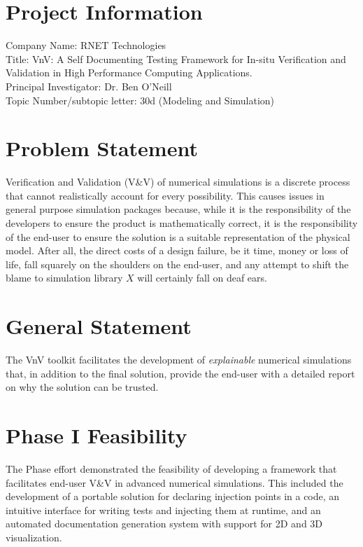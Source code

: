 
\section*{Project Information}
Company Name: RNET Technologies\\
Title: VnV: A Self Documenting Testing Framework for In-situ Verification and Validation in High Performance Computing Applications. \\
Principal Investigator: Dr. Ben O'Neill\\
Topic Number/subtopic letter: 30d (Modeling and Simulation)

\section*{Problem Statement}
Verification and Validation (V\&V) of numerical simulations is a discrete process that cannot realistically account for every possibility. This causes issues in general purpose simulation packages because, while it is the responsibility of the developers to ensure the product is mathematically correct, it is the responsibility of the end-user to ensure the solution is a suitable representation of the physical model. After all, the direct costs of a design failure, be it time, money or loss of life, fall squarely on the shoulders on the end-user, and any attempt to shift the blame to simulation library $X$ will certainly fall on deaf ears. 
\section*{General Statement}
The VnV toolkit facilitates the development of \emph{explainable} numerical simulations that, in addition to the final solution, provide the end-user with a detailed report on why the solution can be trusted. 

\section*{Phase I Feasibility}
The Phase effort demonstrated the feasibility of developing a framework that facilitates end-user V\&V
in advanced numerical simulations. This included the development of 
a portable solution for declaring injection points in a code, an intuitive interface 
for writing tests and injecting them at runtime, and an automated documentation generation
system with support for 2D and 3D visualization. 

